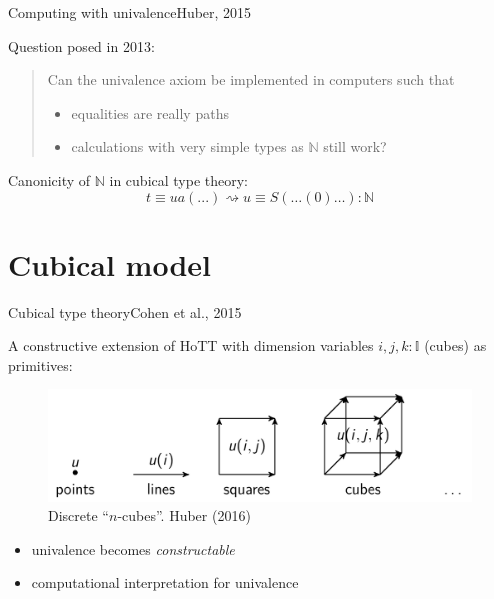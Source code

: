 \documentclass[english]{beamer}
\begin{document}
\begin{frame}{Computing with univalence}{Huber, 2015}

Question posed in 2013:

\begin{quotation}
Can the univalence axiom be implemented in computers such that
\begin{itemize} 
 \item equalities are really paths 
 \item calculations with very simple types as $\mathbb{N}$ still work?
 \end{itemize}
\end{quotation}

Canonicity of $\mathbb{N}$ in cubical type theory:
$$ t \equiv ua ( ... )  \rightsquigarrow u \equiv S ( \dots ( 0 ) \ldots ) : \mathbb{N}  $$



% 


\end{frame}




\section{Cubical model}

\begin{frame}{Cubical type theory}{Cohen et al., 2015}

A constructive extension of HoTT with dimension variables $i,j,k : \mathbb{I}$ (cubes) as primitives:

\begin{figure}[h!]
    \includegraphics[width=.7\textwidth]{figures/cubes.png}
    \caption{Discrete ``$n$-cubes''. Huber (2016)}
\end{figure}


\begin{itemize}
\item univalence becomes \emph{constructable}
\item computational interpretation for univalence 
\end{itemize}

\end{frame}
\end{document}
